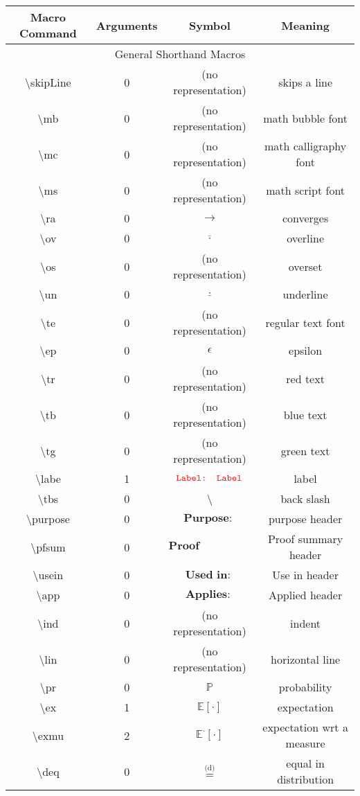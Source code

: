 \documentclass[12pt]{article}
\newcommand{\mb}{\mathbb}
\newcommand{\ra}{\rightarrow}
\newcommand{\ov}{\overline}
\newcommand{\un}{\underline}
\newcommand{\ep}{\epsilon}
\newcommand{\tr}{\textcolor{red}}
\newcommand{\labe}[1]{\tr{\texttt{Label: #1}}}
\newcommand{\tbs}{\textbackslash}
\newcommand{\purpose}{\textbf{Purpose: }}
\newcommand{\pfsum}{\textbf{Proof Summary: }}
\newcommand{\usein}{\textbf{Used in: }}
\newcommand{\app}{\textbf{Applies: }}
\newcommand{\pr}{\mb{P}}							%
\newcommand{\ex}[1]{\mb{E}\left[#1\right]}			%
\newcommand{\exmu}[2]{\mb{E}^{#1}\left[#2\right]}	%
\newcommand{\deq}{\overset{\text{(d)}}{=}}			%
\begin{document}
\begin{longtable}{|c|c|c|c|}
\hline Macro Command & Arguments & Symbol & Meaning\\\hline
\multicolumn{4}{|c|}{General Shorthand Macros}\\\hline
\tbs skipLine & 0 & (no representation) & skips a line\\\hline
\tbs mb & 0 & (no representation) & math bubble font\\\hline
\tbs mc & 0 & (no representation) & math calligraphy font\\\hline
\tbs ms & 0 & (no representation) & math script font\\\hline
\tbs ra & 0 & \(\ra\) & converges\\\hline
\tbs ov & 0 & \(\ov{\cdot}\) & overline\\\hline
\tbs os & 0 & (no representation) & overset\\\hline
\tbs un & 0 & \(\un{\cdot}\) & underline\\\hline
\tbs te & 0 & (no representation) & regular text font\\\hline
\tbs ep & 0 & \(\ep\) & epsilon\\\hline
\tbs tr & 0 & (no representation) & red text\\\hline
\tbs tb & 0 & (no representation) & blue text\\\hline
\tbs tg & 0 & (no representation) & green text\\\hline
\tbs labe & 1 & \(\labe{Label}\) & label\\\hline
\tbs tbs & 0 & \tbs & back slash\\\hline
\tbs purpose & 0 & \(\purpose\) & purpose header\\\hline
\tbs pfsum & 0 & \(\pfsum\) & Proof summary header\\\hline
\tbs usein &0  & \(\usein\) & Use in header\\\hline
\tbs app & 0 & \(\app\) & Applied header\\\hline
\tbs ind & 0 & (no representation) & indent \\\hline
\tbs lin & 0 & (no representation) & horizontal line\\\hline
\tbs pr & 0 & \(\pr\) & probability\\\hline
\tbs ex & 1 & \(\ex{\cdot}\) & expectation\\\hline
\tbs exmu & 2 & \(\exmu{\cdot}{\cdot}\) & expectation wrt a measure\\\hline
\tbs deq & 0 & \(\deq\) & equal in distribution\\\hline	

\end{longtable}
\end{document}
